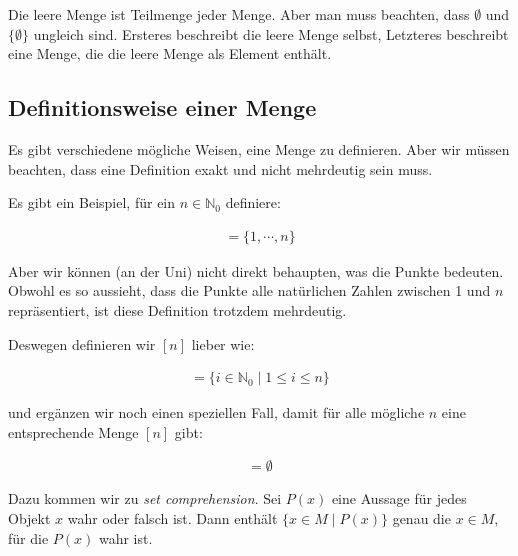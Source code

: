 \documentclass[12pt,a4paper,oneside]{article}
\newcommand{\emptyline}{\hspace*{\fill}}
\newcommand{\N}{\mathbb{N}}
\begin{document}
            Die leere Menge ist Teilmenge jeder Menge.
            Aber man muss beachten, dass $\emptyset$ und $\{\emptyset\}$ ungleich sind.
            Ersteres beschreibt die leere Menge selbst, Letzteres beschreibt eine Menge,
            die die leere Menge als Element enthält.

        \subsection{Definitionsweise einer Menge}

            Es gibt verschiedene mögliche Weisen, eine Menge zu definieren.
            Aber wir müssen beachten, dass eine Definition exakt und nicht mehrdeutig sein muss.

            \emptyline

            Es gibt ein Beispiel, für ein $n \in \N_0$ definiere:

            \vspace{-1em}
            \begin{align*}
                [n] = \{1, \cdots, n\}
            \end{align*}

            Aber wir können (an der Uni) nicht direkt behaupten, was die Punkte bedeuten.
            Obwohl es so aussieht, dass die Punkte alle natürlichen Zahlen zwischen 1 und $n$ repräsentiert,
            ist diese Definition trotzdem mehrdeutig.
            
            \emptyline

            Deswegen definieren wir $[n]$ lieber wie:

            \vspace{-1em}
            \begin{align*}
                [n] = \{i \in \N_0 \;|\; 1 \leq i \leq n\}
            \end{align*}

            und ergänzen wir noch einen speziellen Fall, damit für alle mögliche $n$ eine entsprechende Menge $[n]$ gibt:

            \vspace{-1em}
            \begin{align*}
                [0] = \emptyset
            \end{align*}

            Dazu kommen wir zu \textit{set comprehension}.
            Sei $P(x)$ eine Aussage für jedes Objekt $x$ wahr oder falsch ist.
            Dann enthält $\{x \in M \;|\; P(x)\}$ genau die $x \in M$, für die $P(x)$ wahr ist.
\end{document}
